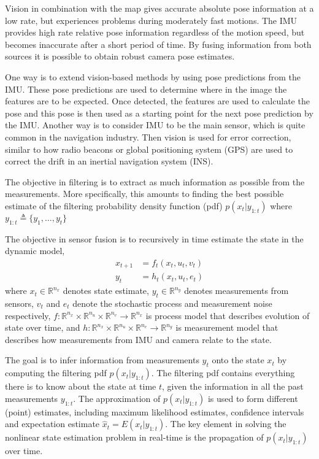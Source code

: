 Vision in combination with the map gives accurate absolute pose information at a low rate, but experiences problems during moderately fast motions. The IMU provides high rate relative pose information regardless of the motion speed, but becomes inaccurate after a short period of time. By fusing information from both sources it is possible to obtain robust camera pose estimates.

One way is to extend vision-based methods by using pose predictions from the IMU. These pose predictions are used to determine where in the image the features are to be expected. Once detected, the features are used to calculate the pose and this pose is then used as a starting point for the next pose prediction by the IMU. Another way is to consider IMU to be the main sensor, which is quite common in the navigation industry. Then vision is used for error correction, similar to how radio beacons or global positioning system (GPS) are used to correct the drift in an inertial navigation system (INS). 

The objective in filtering is to extract as much information as possible from the measurements. More specifically, this amounts to finding the best possible estimate of the filtering probability density function (pdf) $ p( x_{t} | y_{1:t} ) $ where $ y_{1:t} \triangleq %
\{ y_{1}, \ldots, y_{t} \} $

The objective in sensor fusion is to recursively in time estimate the state in the dynamic model,
\begin{subequations} \label{eq:fusion}
	\begin{align}
	x_{t+1} &= f_{t} ( x_{t} ,u_{t} , v_{t} )\\
	y_{t} &= h_{t} ( x_{t} ,u_{t} , e_{t} )
	\end{align}
\end{subequations}
where $ x_{t} \in \mathbb{R}^{n_{x}} $ denotes state estimate, $ y_{t} \in \mathbb{R}^{n_{y}} $ denotes  measurements from sensors, $ v_{t} $ and $ e_{t} $ denote the stochastic process and measurement noise respectively, $ f : \mathbb{R}^{n_{x}} \times \mathbb{R}^{n_{u}} \times \mathbb{R}^{n_{v}} \rightarrow \mathbb{R}^{n_{x}} $ is process model that describes evolution of state over time, and $ h : \mathbb{R}^{n_{x}} \times \mathbb{R}^{n_{u}} \times \mathbb{R}^{n_{e}} \rightarrow \mathbb{R}^{n_{y}} $ is measurement model that describes how measurements from IMU and  camera relate to the state.  

The goal is to infer information from measurements $ y_{t} $ onto the state $ x_{t} $ by computing the filtering pdf $ p ( x_{t} | y_{1:t} ) $.  The filtering pdf contains everything there is to know about the state at time $ t $, given the information in all the past measurements $ y_{1:t} $. The approximation of $ p ( x_{t} | y_{1:t} ) $ is used to form different (point) estimates, including maximum likelihood estimates, confidence intervals and expectation estimate $ \hat{x}_{t} = E( x_{t} | y_{1:t} ) $. The key element in solving the nonlinear state estimation problem in real-time is the propagation of $ p ( x_{t} | y_{1:t} ) $ over time. 

